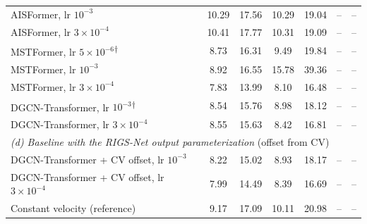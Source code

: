 \begin{table}[t]
\begin{tabular}{lcccccc}
AISFormer, lr $10^{-3}$ & 10.29 & 17.56 & 10.29 & 19.04 & -- & -- \\
AISFormer, lr $3\times10^{-4}$ & 10.41 & 17.77 & 10.31 & 19.09 & -- & -- \\
MSTFormer, lr $5\times10^{-6}$\textsuperscript{$\dagger$} & 8.73 & 16.31 & 9.49 & 19.84 & -- & -- \\
MSTFormer, lr $10^{-3}$ & 8.92 & 16.55 & 15.78 & 39.36 & -- & -- \\
MSTFormer, lr $3\times10^{-4}$ & 7.83 & 13.99 & 8.10 & 16.48 & -- & -- \\
DGCN-Transformer, lr $10^{-3}$\textsuperscript{$\dagger$} & 8.54 & 15.76 & 8.98 & 18.12 & -- & -- \\
DGCN-Transformer, lr $3\times10^{-4}$ & 8.55 & 15.63 & 8.42 & 16.81 & -- & -- \\
\midrule
\multicolumn{7}{l}{\textit{(d) Baseline with the RIGS-Net output parameterization} (offset from CV)} \\
DGCN-Transformer + CV offset, lr $10^{-3}$ & 8.22 & 15.02 & 8.93 & 18.17 & -- & -- \\
DGCN-Transformer + CV offset, lr $3\times10^{-4}$ & 7.99 & 14.49 & 8.39 & 16.69 & -- & -- \\
\midrule
Constant velocity (reference) & 9.17 & 17.09 & 10.11 & 20.98 & -- & -- \\
\bottomrule
\end{tabular}
\end{table}
